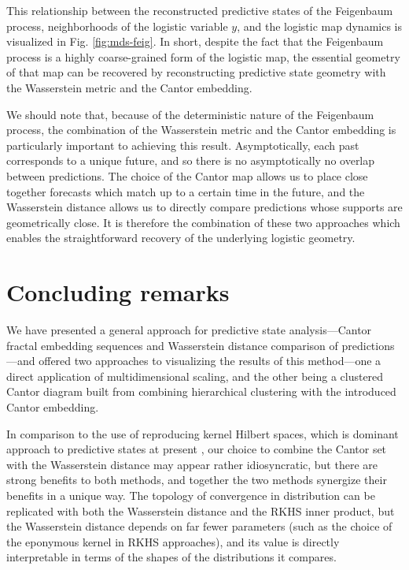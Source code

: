 \documentclass[sigconf, anonymous, review]{acmart}
\begin{document}
This relationship between the reconstructed predictive states of the Feigenbaum
process, neighborhoods of the logistic variable $y$, and the logistic map
dynamics is visualized in Fig. \ref{fig:mds-feig}. In short, despite the fact
that the Feigenbaum process is a highly coarse-grained form of the logistic map,
the essential geometry of that map can be recovered by reconstructing predictive
state geometry with the Wasserstein metric and the Cantor embedding.

We should note that, because of the deterministic nature of the Feigenbaum
process, the combination of the Wasserstein metric and the Cantor embedding is
particularly important to achieving this result. Asymptotically, each past
corresponds to a unique future, and so there is no asymptotically no overlap
between predictions. The choice of the Cantor map allows us to place close
together forecasts which match up to a certain time in the future, and the
Wasserstein distance allows us to directly compare predictions whose supports
are geometrically close. It is therefore the combination of these two approaches
which enables the straightforward recovery of the underlying logistic geometry.

\section{Concluding remarks}
We have presented a general approach for predictive state analysis---Cantor
fractal embedding sequences and Wasserstein distance comparison of
predictions---and offered two approaches to visualizing the results of this
method---one a direct application of multidimensional scaling, and the other
being a clustered Cantor diagram built from combining hierarchical clustering
with the introduced Cantor embedding.

In comparison to the use of reproducing kernel Hilbert spaces, which is dominant
approach to predictive states at present
\cite{Song09a,Song10a,Boot13a,Brod20a,Loom21a}, our choice to combine the Cantor
set with the Wasserstein distance may appear rather idiosyncratic, but there are
strong benefits to both methods, and together the two methods synergize their
benefits in a unique way. The topology of convergence in distribution can be
replicated with both the Wasserstein distance and the RKHS inner product, but
the Wasserstein distance depends on far fewer parameters (such as the choice of
the eponymous kernel in RKHS approaches), and its value is directly
interpretable in terms of the shapes of the distributions it compares.
\end{document}
